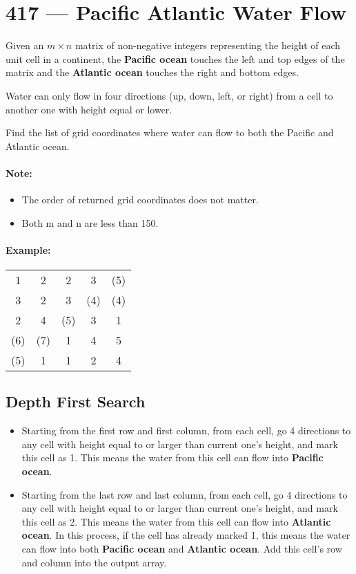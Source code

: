 \section{417 --- Pacific Atlantic Water Flow}
Given an $m \times n$ matrix of non-negative integers representing the height of each unit cell in a continent, the \textbf{Pacific ocean} touches the left and top edges of the matrix and the \textbf{Atlantic ocean} touches the right and bottom edges.
\par
Water can only flow in four directions (up, down, left, or right) from a cell to another one with height equal or lower.
\par
Find the list of grid coordinates where water can flow to both the Pacific and Atlantic ocean.

\paragraph{Note:}
\begin{itemize}
\item The order of returned grid coordinates does not matter.
\item Both m and n are less than 150.
\end{itemize}

\paragraph{Example:}
\begin{flushleft}

\begin{table}[H]
\begin{tabular}{*{5}{c}}
1 & 2 & 2 & 3 & (5) \\
3 & 2 & 3 & (4) & (4) \\
2 & 4 & (5) & 3 & 1 \\
(6) & (7) & 1 & 4 & 5 \\
(5) & 1 & 1 & 2 & 4
\end{tabular}
\end{table}
\end{flushleft}

\subsection{Depth First Search}
\begin{itemize}
\item Starting from the first row and first column, from each cell, go 4 directions to any cell with height equal to or larger than current one's height, and mark this cell as 1. This means the water from this cell can flow into \textbf{Pacific ocean}.
\item Starting from the last row and last column, from each cell, go 4 directions to any cell with height equal to or larger than current one's height, and mark this cell as 2. This means the water from this cell can flow into \textbf{Atlantic ocean}. In this process, if the cell has already marked 1, this means the water can flow into both \textbf{Pacific ocean} and \textbf{Atlantic ocean}. Add this cell's row and column into the output array.
\end{itemize}

